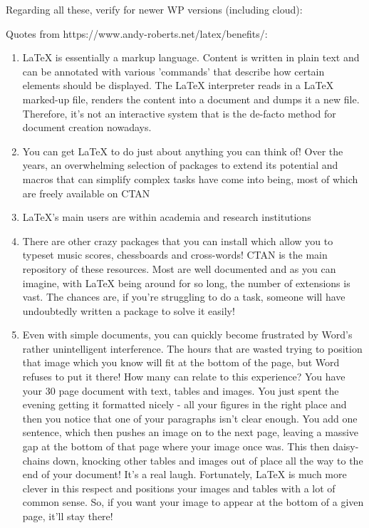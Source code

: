\documentclass[12pt]{article}
\begin{document}
Regarding all these, verify for newer WP versions (including cloud):

Quotes from https://www.andy-roberts.net/latex/benefits/:
\begin{enumerate}
  \item LaTeX is essentially a markup language. Content is written in plain text and can be annotated with various 'commands' that describe how certain elements should be displayed. The LaTeX interpreter reads in a LaTeX marked-up file, renders the content into a document and dumps it a new file. Therefore, it's not an interactive system that is the de-facto method for document creation nowadays.
  \item You can get LaTeX to do just about anything you can think of! Over the years, an overwhelming selection of packages to extend its potential and macros that can simplify complex tasks have come into being, most of which are freely available on CTAN
  \item LaTeX's main users are within academia and research institutions
  \item There are other crazy packages that you can install which allow you to typeset music scores, chessboards and cross-words! CTAN is the main repository of these resources. Most are well documented and as you can imagine, with LaTeX being around for so long, the number of extensions is vast. The chances are, if you're struggling to do a task, someone will have undoubtedly written a package to solve it easily!
  \item Even with simple documents, you can quickly become frustrated by Word's rather unintelligent interference. The hours that are wasted trying to position that image which you know will fit at the bottom of the page, but Word refuses to put it there! How many can relate to this experience? You have your 30 page document with text, tables and images. You just spent the evening getting it formatted nicely - all your figures in the right place and then you notice that one of your paragraphs isn't clear enough. You add one sentence, which then pushes an image on to the next page, leaving a massive gap at the bottom of that page where your image once was. This then daisy-chains down, knocking other tables and images out of place all the way to the end of your document! It's a real laugh. Fortunately, LaTeX is much more clever in this respect and positions your images and tables with a lot of common sense. So, if you want your image to appear at the bottom of a given page, it'll stay there!


\end{enumerate}
\end{document}

